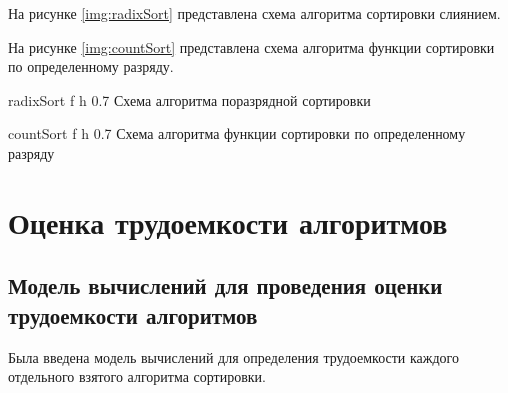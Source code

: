 На рисунке \ref{img:radixSort} представлена схема алгоритма сортировки слиянием.

На рисунке \ref{img:countSort} представлена схема алгоритма функции сортировки по определенному разряду.

{radixSort} %
{f} %
{h} %
{0.7\textwidth} %
{Схема алгоритма поразрядной сортировки} %

{countSort} %
{f} %
{h} %
{0.7\textwidth} %
{Схема алгоритма функции сортировки по определенному разряду} %

\clearpage

\section{Оценка трудоемкости алгоритмов}

\subsection{Модель вычислений для проведения оценки трудоемкости алгоритмов}

Была введена модель вычислений для определения трудоемкости каждого отдельного взятого алгоритма сортировки.

